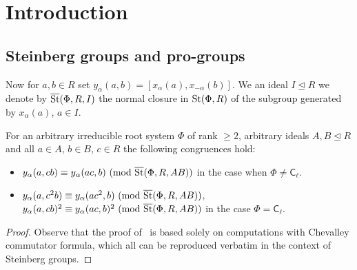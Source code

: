 \documentclass[oneside, 11pt]{amsart} \pdfoutput=1
\begin{document}



\newcommand{\Set}{\mathbf{Set}}
\newcommand{\Group}{\mathbf{Grp}}
\newcommand{\Rng}{\mathbf{Rng}}
\newcommand{\Fun}{\mathbf{Fun}}
\newcommand{\Mod}{\mathbf{Mod}}
\newcommand{\op}{\mathrm{op}}
\newcommand{\ZZ}{\mathbb{Z}}

\newcommand{\otimeshat}{\mathbin{\widehat{\otimes}}}

\newcommand{\up}[2]{{^{#1}\!{#2}}}

\newcommand{\rA}{\mathsf{A}}
\newcommand{\rB}{\mathsf{B}}
\newcommand{\rC}{\mathsf{C}}
\newcommand{\rD}{\mathsf{D}}
\newcommand{\rE}{\mathsf{E}}
\newcommand{\rF}{\mathsf{F}}
\newcommand{\rG}{\mathsf{G}}

\newcommand{\catname}[1]{{\normalfont\textbf{#1}}} %

\section{Introduction}
\subsection{Steinberg groups and pro-groups}

Now for $a, b \in R$ set $y_\alpha(a, b) = [x_\alpha(a), x_{-\alpha}(b)]$.
We an ideal $I \trianglelefteq R$ we denote by $\overline{\mathop{\mathrm{St}}\nolimits}(\Phi, R, I)$ the normal closure in $\mathop{\mathrm{St}}\nolimits(\Phi, R)$ of the subgroup generated by $x_\alpha(a)$, $a\in I$.

\begin{lemma} \label{lem:c-identities} For an arbitrary irreducible root system $\Phi$ of rank $\geq 2$, arbitrary ideals $A, B \trianglelefteq R$ and all $a \in A$, $b \in B$, $c \in R$ the following congruences hold:
\begin{itemize}
 \item $y_\alpha(a, cb) \equiv y_\alpha(ac, b)\ (\mathrm{mod}\ \overline{\mathop{\mathrm{St}}\nolimits}(\Phi, R, AB))$ in the case when $\Phi \neq \rC_{\ell}$.
 \item $y_\alpha(a, c^2b) \equiv y_\alpha(ac^2, b)\ (\mathrm{mod}\ \overline{\mathop{\mathrm{St}}\nolimits}(\Phi, R, AB))$, $y_\alpha(a, cb)^2 \equiv y_\alpha(ac, b)^2\ (\mathrm{mod}\ \overline{\St}(\Phi, R, AB))$ in the case $\Phi = \rC_{\ell}$.
\end{itemize} \end{lemma}
\begin{proof}
 Observe that the proof of~\cite[Theorem~5]{VZ20} is based solely on computations with Chevalley commutator formula, which all can be reproduced verbatim in the context of Steinberg groups.
\end{proof}
\end{document}
